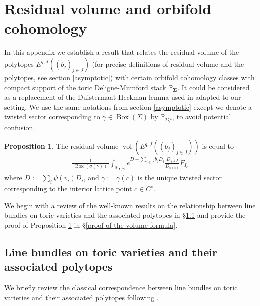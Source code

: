 \documentclass[11pt,reqno]{amsart}
\def\PP {{\mathbb P}}
\theoremstyle{definition}
\newtheorem{proposition}[theorem]{Proposition}
\numberwithin{equation}{section}
\begin{document}
\appendix

\section{Residual volume and orbifold cohomology}\label{volume}

In this appendix we establish a result that relates the residual volume of the polytopes $E^{q,J}((b_j)_{j\in J})$ (for precise definitions of residual volume and the polytopes, see section \ref{asymptotic}) with certain orbifold cohomology classes with compact support of the toric Deligne-Mumford stack $\PP_{\mathbf{\Sigma}}$. It could be considered as a replacement of the Duistermaat-Heckman lemma used in \cite{AGIS} adapted to our setting. We use the same notations from section \ref{asymptotic} except we denote a twisted sector corresponding to $\gamma\in\operatorname{Box}(\Sigma)$ by $\PP_{\mathbf{\Sigma}/\gamma}$ to avoid potential confusion.

\smallskip

\begin{proposition}\label{volume and cohomology}
	The residual volume $\operatorname{vol}(E^{q,J}((b_j)_{j\in J}))$ is equal to
	\begin{align*}
		\frac{1}{|\operatorname{Box}(\sigma(\gamma))|}\int_{\PP_{\mathbf{\Sigma}/\gamma}}e^{D-\sum_{j\in J}b_jD_j}\frac{D_{q\sqcup J}}{D_{\sigma(c)}}F_{I_c}
	\end{align*}
	where $D:=\sum_{i}\psi(v_i)D_i$, and $\gamma:=\gamma(c)$ is the unique twisted sector corresponding to the interior lattice point $c\in C^{\circ}$.
\end{proposition}

\smallskip

We begin with a review of the well-known results on the relationship between line bundles on toric varieties and the associated polytopes in \S\ref{line bundles and polytopes} and provide the proof of Proposition \ref{volume and cohomology} in \S\ref{proof of the volume formula}.


\subsection{Line bundles on toric varieties and their associated polytopes}\label{line bundles and polytopes}

We briefly review the classical correspondence between line bundles on toric varieties and their associated polytopes following \cite{Cox}.
\end{document}
